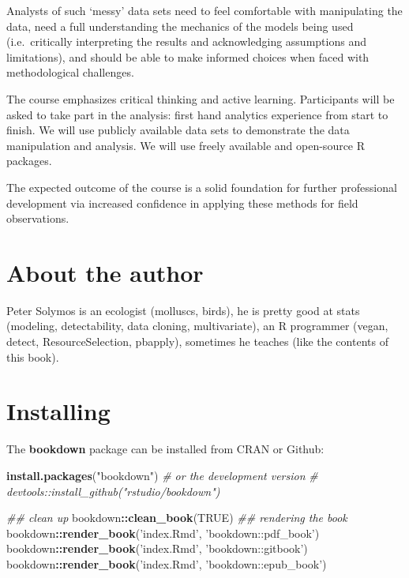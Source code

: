 \documentclass[12pt,]{book}
\newenvironment{Shaded}{\begin{snugshade}}{\end{snugshade}}
\newcommand{\CommentTok}[1]{\textcolor[rgb]{0.56,0.35,0.01}{\textit{#1}}}
\newcommand{\KeywordTok}[1]{\textcolor[rgb]{0.13,0.29,0.53}{\textbf{#1}}}
\newcommand{\NormalTok}[1]{#1}
\newcommand{\OperatorTok}[1]{\textcolor[rgb]{0.81,0.36,0.00}{\textbf{#1}}}
\newcommand{\OtherTok}[1]{\textcolor[rgb]{0.56,0.35,0.01}{#1}}
\newcommand{\StringTok}[1]{\textcolor[rgb]{0.31,0.60,0.02}{#1}}
\begin{document}
Analysts of such `messy' data sets need to feel comfortable
with manipulating the data, need a full understanding the mechanics of the
models being used (i.e.~critically interpreting the results and acknowledging
assumptions and limitations), and should be able to make informed choices when
faced with methodological challenges.

The course emphasizes critical thinking and active learning.
Participants will be asked to take part in the analysis:
first hand analytics experience from start to finish.
We will use publicly available data sets to demonstrate the data manipulation
and analysis. We will use freely available and open-source R packages.

The expected outcome of the course is a solid foundation for further
professional development via increased confidence in applying these methods
for field observations.

\hypertarget{about-the-author}{%
\section*{About the author}\label{about-the-author}}

Peter Solymos is an ecologist (molluscs, birds), he is pretty good at stats (modeling, detectability, data cloning, multivariate), an R programmer (vegan, detect, ResourceSelection, pbapply),
sometimes he teaches (like the contents of this book).

\hypertarget{installing}{%
\section*{Installing}\label{installing}}

The \textbf{bookdown} package can be installed from CRAN or Github:

\begin{Shaded}
\begin{Highlighting}[]
\KeywordTok{install.packages}\NormalTok{(}\StringTok{"bookdown"}\NormalTok{)}
\CommentTok{# or the development version}
\CommentTok{# devtools::install_github("rstudio/bookdown")}

\CommentTok{## clean up }
\NormalTok{bookdown}\OperatorTok{::}\KeywordTok{clean_book}\NormalTok{(}\OtherTok{TRUE}\NormalTok{)}
\CommentTok{## rendering the book}
\NormalTok{bookdown}\OperatorTok{::}\KeywordTok{render_book}\NormalTok{(}\StringTok{'index.Rmd'}\NormalTok{, }\StringTok{'bookdown::pdf_book'}\NormalTok{)}
\NormalTok{bookdown}\OperatorTok{::}\KeywordTok{render_book}\NormalTok{(}\StringTok{'index.Rmd'}\NormalTok{, }\StringTok{'bookdown::gitbook'}\NormalTok{)}
\NormalTok{bookdown}\OperatorTok{::}\KeywordTok{render_book}\NormalTok{(}\StringTok{'index.Rmd'}\NormalTok{, }\StringTok{'bookdown::epub_book'}\NormalTok{)}
\end{Highlighting}
\end{Shaded}
\end{document}
